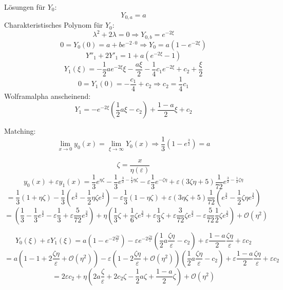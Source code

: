 \documentclass[a4paper,11pt]{scrartcl}
\newcommand*{\eps}{\varepsilon}
\newcommand*{\Ld}{\mathcal{O}}
\begin{document}
\begin{enumerate}[label*=\textbf{8.\arabic*.}]
\begin{enumerate}
    Lösungen für $Y_0$:
    \[ Y_{0, a} = a\]
    Charakteristisches Polynom für $Y_0$:
    \[\lambda^2 + 2 \lambda = 0 \Rightarrow Y_{0, b} = e^{-2\xi}\]
    \[0 = Y_0(0) = a + b e^{-2 \cdot 0} \Rightarrow Y_0 = a (1 - e^{-2\xi}) \]
    \[Y''_1 + 2 Y'_1 = 1 + a (e^{-2 \xi} - 1)\]
    \[Y_1(\xi) = -\frac{1}{2} a e^{-2\xi} \xi - \frac{a\xi}{2} -\frac{1}{4} c_1
      e^{-2 \xi} + c_2 + \frac{\xi}{2} \]
    \[0= Y_1(0) = -\frac{c_1}{4} + c_2 \Rightarrow c_2 = \frac{1}{4} c_1\]
    Wolframalpha anscheinend:
    \[Y_1 = -e^{-2\xi} \left(\frac{1}{2}a \xi - c_2\right) + \frac{1-a}{2} \xi
      + c_2\]

    Matching:
    \[\lim_{x\rightarrow 0} y_0(x) = \lim_{\xi \rightarrow \infty} Y_0(x)
      \Rightarrow \frac{1}{3}( 1 -e^{\frac{3}{2}}) = a\]

    \[\zeta = \frac{x}{\eta(\eps)}\]
    \[y_0(x) + \eps y_1(x) = \frac{1}{3} e^{\eta\zeta} - \frac{1}{3}
      e^{\frac{3}{2} - \frac{1}{2}\eta\zeta} - \eps \frac{1}{3} e^{-\zeta
        \eta}+ \eps(3 \zeta \eta + 5) \frac{1}{72} e^{\frac{3}{2} - \frac{1}{2}
        \zeta \eta}\]
    \[ = \frac{1}{3} (1 + \eta \zeta) - \frac{1}{3} (e^{\frac{3}{2}}
      -\frac{1}{2} \eta \zeta e^{\frac{3}{2}}) - \eps \frac{1}{3} (1 - \eta
      \zeta) + \eps (3 \eta \zeta + 5) \frac{1}{72} (e^{\frac{3}{2}}
      -\frac{1}{2} \zeta \eta e^{\frac{3}{2}}) \]
    \[= \left(\frac{1}{3} -\frac{1}{3} e^{\frac{3}{2}} - \eps \frac{1}{3} + \eps
        \frac{5}{72} e^{\frac{3}{2}}\right)
    + \eta\left( \frac{1}{3} \zeta + \frac{1}{6} \zeta
        e^{\frac{3}{2}} + \eps \frac{1}{3} \zeta + \eps \frac{3}{72} \zeta
        e^{\frac{3}{2}} - \eps \frac{5}{72} \frac{1}{2}\zeta e^{\frac{3}{2}}
      \right) + \Ld(\eta^2) \]

    \[Y_0(\xi)+\eps Y_1(\xi) = a (1 - e^{-2 \frac{\zeta \eta}{\eps}}) - \eps
      e^{-2\frac{\zeta \eta}{\eps}} \left( \frac{1}{2} a \frac{\zeta \eta}{\eps}
      - c_2 \right) + \eps \frac{1 - a}{2}\frac{\zeta\eta}{\eps} + \eps c_2   \]
    \[ = a (1 - 1 + 2 \frac{\zeta \eta}{\eps} + \Ld(\eta^2)) - \eps
      (1 - 2\frac{\zeta \eta}{\eps} + \Ld(\eta^2)) \left( \frac{1}{2} a \frac{\zeta \eta}{\eps}
      - c_2 \right) + \eps \frac{1 - a}{2}\frac{\zeta\eta}{\eps} + \eps c_2   \]
  \[ = 2\eps c_2 + \eta \left( 2 a\frac{\zeta}{\eps} + 2 c_2 \zeta - \frac{1}{2}
    a \zeta + \frac{1-a}{2}\zeta\right) + \Ld(\eta^2)\]
      



\end{enumerate}
\end{enumerate}
\end{document}
